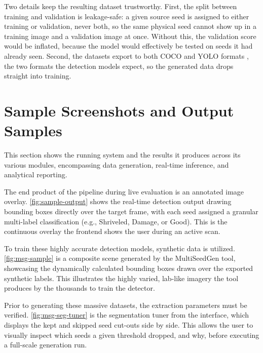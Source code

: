 Two details keep the resulting dataset trustworthy. First, the split between
training and validation is leakage-safe: a given source seed is assigned to
either training or validation, never both, so the same physical seed cannot show
up in a training image and a validation image at once. Without this, the
validation score would be inflated, because the model would effectively be tested
on seeds it had already seen. Second, the datasets export to both COCO and YOLO
formats \cite{lin2014coco}, the two formats the detection models expect, so the
generated data drops straight into training.

\section{Sample Screenshots and Output Samples}

This section shows the running system and the results it produces across its various modules, encompassing data generation, real-time inference, and analytical reporting.

The end product of the pipeline during live evaluation is an annotated image overlay. \autoref{fig:sample-output} shows the real-time detection output drawing bounding boxes directly over the target frame, with each seed assigned a granular multi-label classification (e.g., Shriveled, Damage, or Good). This is the continuous overlay the frontend shows the user during an active scan.


To train these highly accurate detection models, synthetic data is utilized. \autoref{fig:msg-sample} is a composite scene generated by the MultiSeedGen tool, showcasing the dynamically calculated bounding boxes drawn over the exported synthetic labels. This illustrates the highly varied, lab-like imagery the tool produces by the thousands to train the detector.


Prior to generating these massive datasets, the extraction parameters must be verified. \autoref{fig:msg-seg-tuner} is the segmentation tuner from the interface, which displays the kept and skipped seed cut-outs side by side. This allows the user to visually inspect which seeds a given threshold dropped, and why, before executing a full-scale generation run.

